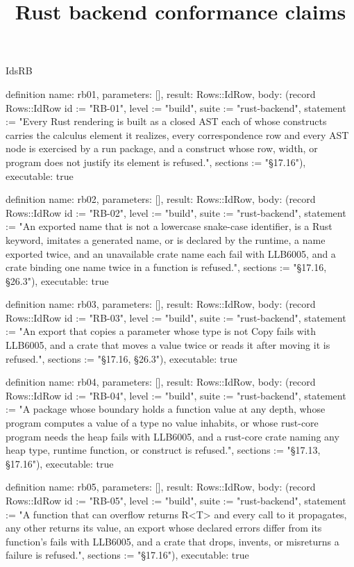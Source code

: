 \begin{lexlean}{IdsRB}
\title{Rust backend conformance claims}
\begin{semanticmodule}
definition{
  name: rb01,
  parameters: [],
  result: Rows::IdRow,
  body: (record Rows::IdRow {id := "RB-01", level := "build", suite := "rust-backend", statement := "Every Rust rendering is built as a closed AST each of whose constructs carries the calculus element it realizes, every correspondence row and every AST node is exercised by a run package, and a construct whose row, width, or program does not justify its element is refused.", sections := "§17.16"}),
  executable: true
}

definition{
  name: rb02,
  parameters: [],
  result: Rows::IdRow,
  body: (record Rows::IdRow {id := "RB-02", level := "build", suite := "rust-backend", statement := "An exported name that is not a lowercase snake-case identifier, is a Rust keyword, imitates a generated name, or is declared by the runtime, a name exported twice, and an unavailable crate name each fail with LLB6005, and a crate binding one name twice in a function is refused.", sections := "§17.16, §26.3"}),
  executable: true
}

definition{
  name: rb03,
  parameters: [],
  result: Rows::IdRow,
  body: (record Rows::IdRow {id := "RB-03", level := "build", suite := "rust-backend", statement := "An export that copies a parameter whose type is not Copy fails with LLB6005, and a crate that moves a value twice or reads it after moving it is refused.", sections := "§17.16, §26.3"}),
  executable: true
}

definition{
  name: rb04,
  parameters: [],
  result: Rows::IdRow,
  body: (record Rows::IdRow {id := "RB-04", level := "build", suite := "rust-backend", statement := "A package whose boundary holds a function value at any depth, whose program computes a value of a type no value inhabits, or whose rust-core program needs the heap fails with LLB6005, and a rust-core crate naming any heap type, runtime function, or construct is refused.", sections := "§17.13, §17.16"}),
  executable: true
}

definition{
  name: rb05,
  parameters: [],
  result: Rows::IdRow,
  body: (record Rows::IdRow {id := "RB-05", level := "build", suite := "rust-backend", statement := "A function that can overflow returns R<T> and every call to it propagates, any other returns its value, an export whose declared errors differ from its function's fails with LLB6005, and a crate that drops, invents, or misreturns a failure is refused.", sections := "§17.16"}),
  executable: true
}


\end{semanticmodule}
\end{lexlean}
